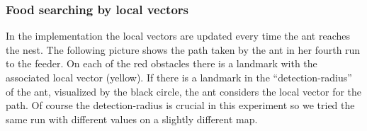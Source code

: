 \documentclass[11pt]{article}
\begin{document}
\subsubsection{Food searching by local vectors}
In the implementation the local vectors are updated every time the ant reaches the nest. The following picture shows the path taken by the ant in her fourth run to the feeder. On each of the red obstacles there is a landmark with the associated local vector (yellow). If there is a landmark in the “detection-radius” of the ant, visualized by the black circle, the ant considers the local vector for the path. Of course the detection-radius is crucial in this experiment so we tried the same run with different values on a slightly different map.
\begin{figure}[h!]
	\centering
	\hspace{1cm}

\end{figure}
\end{document}
